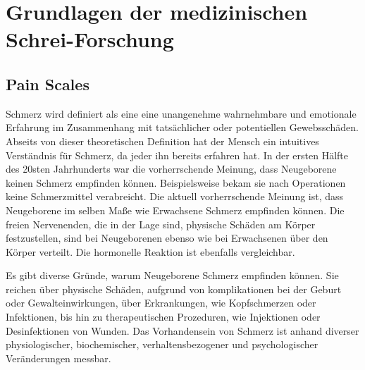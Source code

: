 \chapter{Grundlagen der medizinischen Schrei-Forschung}

\section{Pain Scales}
\label{sec:painScores}

Schmerz wird definiert als eine \glqq eine unangenehme wahrnehmbare und emotionale Erfahrung im Zusammenhang mit tatsächlicher oder potentiellen Gewebsschäden\grqq{}.\cite[S. 438]{PainAssessment01} Abseits von dieser theoretischen Definition hat der Mensch ein intuitives Verständnis für Schmerz, da jeder ihn bereits erfahren hat. In der ersten Hälfte des 20sten Jahrhunderts war die vorherrschende Meinung, dass Neugeborene keinen Schmerz empfinden können. Beispielsweise bekam sie nach Operationen keine Schmerzmittel verabreicht. Die aktuell vorherrschende Meinung ist, dass Neugeborene im selben Maße wie Erwachsene Schmerz empfinden können. Die freien Nervenenden, die in der Lage sind, physische Schäden am Körper festzustellen, sind bei Neugeborenen ebenso wie bei Erwachsenen über den Körper verteilt. Die hormonelle Reaktion ist ebenfalls vergleichbar. \cite[S. 402]{PainAssessment03} \cite[S. 438]{PainAssessment01}

Es gibt diverse Gründe, warum Neugeborene Schmerz empfinden können. Sie reichen über physische Schäden, aufgrund von komplikationen bei der Geburt oder Gewalteinwirkungen, über Erkrankungen, wie Kopfschmerzen oder Infektionen, bis hin zu therapeutischen Prozeduren, wie Injektionen oder Desinfektionen von Wunden.  Das Vorhandensein von Schmerz ist anhand diverser physiologischer, biochemischer, verhaltensbezogener und psychologischer Veränderungen messbar.\cite[S. 441]{PainAssessment01}

